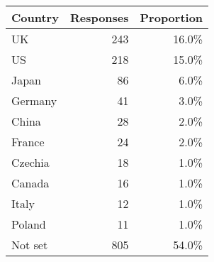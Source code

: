 \begin{tabular}{lrr}
\toprule
Country        &  Responses       &  Proportion \\
\midrule
UK             &       243 &            16.0\% \\
US             &       218 &            15.0\% \\
Japan          &        86 &             6.0\% \\
Germany        &        41 &             3.0\% \\
China          &        28 &             2.0\% \\
France         &        24 &             2.0\% \\
Czechia        &        18 &             1.0\% \\
Canada         &        16 &             1.0\% \\
Italy          &        12 &             1.0\% \\
Poland         &        11 &             1.0\% \\
Not set        &       805 &            54.0\% \\
\bottomrule
\end{tabular}

